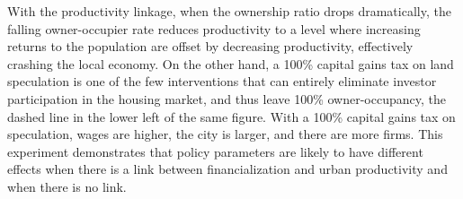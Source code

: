 With the productivity linkage, when the ownership ratio drops dramatically, %
the falling owner-occupier rate reduces productivity to a level where increasing returns to the population are offset by decreasing productivity, effectively crashing the local economy. %
On the other hand, a 100\% capital gains tax on land speculation is one of the few interventions that can entirely eliminate investor participation in the housing market, and thus leave  100\%  owner-occupancy, the dashed line in the lower left of the same figure. %
With a 100\% capital gains tax on speculation, wages are higher, the city is larger, and there are more firms. 
This experiment demonstrates that policy parameters are likely to have different effects when there is a link between financialization and urban productivity and when there is no link.



